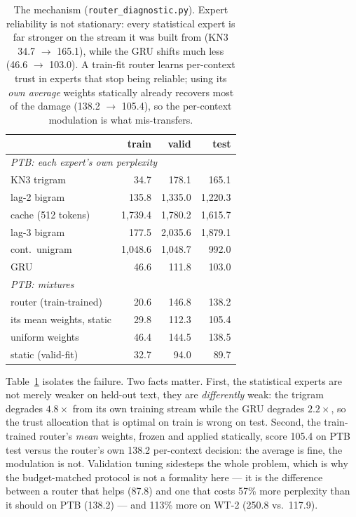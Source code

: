 \documentclass[11pt]{article}
\begin{document}
\begin{table}[t]
\centering\footnotesize
\setlength{\tabcolsep}{4pt}
\begin{tabular}{lrrr}
\toprule
 & train & valid & test \\
\midrule
\multicolumn{4}{l}{\emph{PTB: each expert's own perplexity}} \\
KN3 trigram & 34.7 & 178.1 & 165.1 \\
lag-2 bigram & 135.8 & 1{,}335.0 & 1{,}220.3 \\
cache (512 tokens) & 1{,}739.4 & 1{,}780.2 & 1{,}615.7 \\
lag-3 bigram & 177.5 & 2{,}035.6 & 1{,}879.1 \\
cont.\ unigram & 1{,}048.6 & 1{,}048.7 & 992.0 \\
GRU & 46.6 & 111.8 & 103.0 \\
\midrule
\multicolumn{4}{l}{\emph{PTB: mixtures}} \\
router (train-trained) & 20.6 & 146.8 & 138.2 \\
\quad its mean weights, static & 29.8 & 112.3 & 105.4 \\
uniform weights & 46.4 & 144.5 & 138.5 \\
static (valid-fit) & 32.7 & 94.0 & 89.7 \\
\bottomrule
\end{tabular}
\caption{The mechanism (\texttt{router\_diagnostic.py}). Expert
reliability is not stationary: every statistical expert is far stronger on the
stream it was built from (KN3 34.7 $\rightarrow$ 165.1), while the GRU shifts
much less (46.6 $\rightarrow$ 103.0). A train-fit router learns per-context
trust in experts that stop being reliable; using its \emph{own average} weights
statically already recovers most of the damage (138.2 $\rightarrow$ 105.4), so
the per-context modulation is what mis-transfers.}
\label{tab:shift}
\end{table}

Table~\ref{tab:shift} isolates the failure. Two facts matter. First, the
statistical experts are not merely weaker on held-out text, they are
\emph{differently} weak: the trigram degrades $4.8\times$ from its own training
stream while the GRU degrades $2.2\times$, so the trust allocation that is
optimal on train is wrong on test. Second, the train-trained router's
\emph{mean} weights, frozen and applied statically, score 105.4 on PTB test
versus the router's own 138.2 per-context decision: the average is fine, the
modulation is not. Validation tuning sidesteps the whole problem, which is why
the budget-matched protocol is not a formality here --- it is the difference
between a router that helps (87.8) and one that costs 57\% more perplexity
than it should on PTB (138.2) --- and 113\% more on WT-2 (250.8 vs.\ 117.9).
\end{document}
